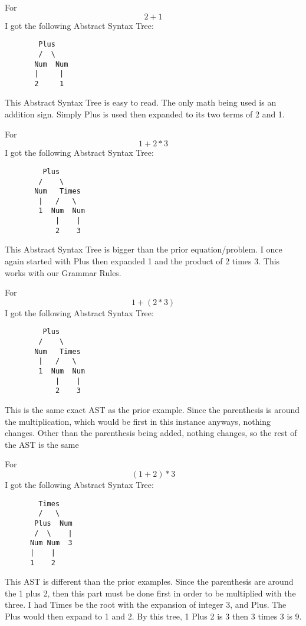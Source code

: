 \documentclass{article}
\theoremstyle{theorem}
\theoremstyle{definition}
\theoremstyle{remark}
\begin{document}
\noindent\newline For $$2+1$$ I got the following Abstract Syntax Tree:
\begin{verbatim}
        Plus
        /  \
       Num  Num
       |     |
       2     1
\end{verbatim}

\noindent\newline This Abstract Syntax Tree is easy to read. The only math being used is an addition sign. Simply Plus is used then expanded to its two terms of 2 and 1.


\noindent\newline\newline For $$1+2*3$$ I got the following Abstract Syntax Tree:
\begin{verbatim}
         Plus
        /    \
       Num   Times
        |   /   \
        1  Num  Num
            |    |
            2    3
\end{verbatim}
\noindent\newline This Abstract Syntax Tree is bigger than the prior equation/problem. I once again started with Plus then expanded 1 and the product of 2 times 3. This works with our Grammar Rules. 

\noindent\newline\newline For $$1+(2*3)$$ I got the following Abstract Syntax Tree:
\begin{verbatim}
         Plus
        /    \
       Num   Times
        |   /   \
        1  Num  Num
            |    |
            2    3
\end{verbatim}
\noindent\newline This is the same exact AST as the prior example. Since the parenthesis is around the multiplication, which would be first in this instance anyways, nothing changes. Other than the parenthesis being added, nothing changes, so the rest of the AST is the same

\noindent\newline\newline For $$(1+2)*3$$ I got the following Abstract Syntax Tree:

\begin{verbatim}
        Times
        /   \
       Plus  Num
       /  \    |
      Num Num  3
      |    |
      1    2
\end{verbatim}
\noindent\newline This AST is different than the prior examples. Since the parenthesis are around the 1 plus 2, then this part must be done first in order to be multiplied with the three. I had Times be the root with the expansion of integer 3, and Plus. The Plus would then expand to 1 and 2. By this tree, 1 Plus 2 is 3 then 3 times 3 is 9. 
\end{document}
